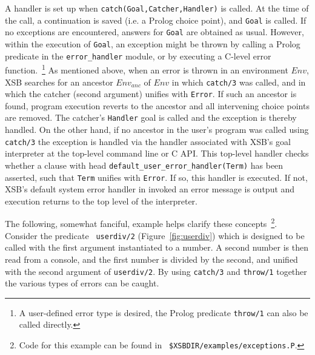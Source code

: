 A handler is set up when {\tt catch(Goal,Catcher,Handler)} is called.
At the time of the call, a continuation is saved (i.e. a Prolog choice
point), and {\tt Goal} is called.  If no exceptions are encountered,
answers for {\tt Goal} are obtained as usual.  However, within the
execution of {\tt Goal}, an exception might be thrown by calling a
Prolog predicate in the {\tt error\_handler} module, or by executing a
C-level error function.~\footnote{A user-defined error type is
  desired, the Prolog predicate {\tt throw/1} can also be called
  directly.}  As mentioned above, when an error is thrown in an
environment $Env$, XSB searches for an ancestor $Env_{anc}$ of $Env$
in which {\tt catch/3} was called, and in which the catcher (second
argument) unifies with {\tt Error}.  If such an ancestor is found,
program execution reverts to the ancestor and all intervening choice
points are removed.  The catcher's {\tt Handler} goal is called and
the exception is thereby handled.  On the other hand, if no ancestor
in the user's program was called using {\tt catch/3} the exception is
handled via the handler associated with XSB's goal interpreter at the
top-level command line or C API.  This top-level handler checks
whether a clause with head {\tt default\_user\_error\_handler(Term)}
has been asserted, such that {\tt Term} unifies with {\tt Error}.  If
so, this handler is executed.  If not, XSB's default system error
handler in invoked an error message is output and execution returns to
the top level of the interpreter.

The following, somewhat fanciful, example helps clarify these
concepts~\footnote{Code for this example can be found in {\tt
\$XSBDIR/examples/exceptions.P}.}.  Consider the predicate {\tt
userdiv/2} (Figure~\ref{fig:userdiv}) which is designed to be called
with the first argument instantiated to a number.  A second number is
then read from a console, and the first number is divided by the
second, and unified with the second argument of {\tt userdiv/2}.  By
using {\tt catch/3} and {\tt throw/1} together the various types of
errors can be caught.

